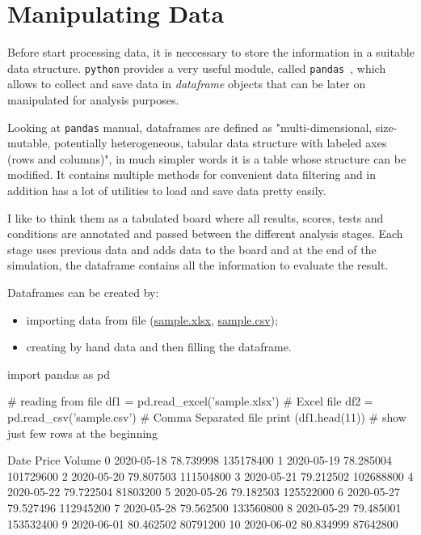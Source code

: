\section{Manipulating Data}
Before start processing data, it is neccessary to store the information in a suitable data structure. \texttt{python} provides a very useful module, called \texttt{pandas}~\cite{pandas}, which allows to collect and save data in \emph{dataframe} objects that can be later on manipulated for analysis purposes.

Looking at \texttt{pandas} manual, dataframes are defined as "multi-dimensional, size-mutable, potentially heterogeneous, tabular data structure with labeled axes (rows and columns)", in much simpler words it is a table whose structure can be modified.
It contains multiple methods for convenient data filtering and in addition has a lot of utilities to load and save data pretty easily.

I like to think them as a tabulated board where all results, scores, tests and conditions are annotated and passed between the different analysis stages. Each stage uses previous data and adds data to the board and at the end of the simulation, the dataframe contains all the information to evaluate the result.


Dataframes can be created by:
\begin{itemize}
\tightlist
\item importing data from file (\href{https://github.com/matteosan1/finance_course/blob/develop/libro/input_files/sample.xlsx?raw=true}{sample.xlsx}, \href{https://raw.githubusercontent.com/matteosan1/finance_course/develop/libro/input_files/sample.csv}{sample.csv});
\item creating by hand data and then filling the dataframe.
\end{itemize}

\begin{ipython}
import pandas as pd

# reading from file
df1 = pd.read_excel('sample.xlsx') # Excel file
df2 = pd.read_csv('sample.csv') # Comma Separated file
print (df1.head(11)) # show just few rows at the beginning
\end{ipython}
\begin{ioutput}
         Date      Price     Volume
0  2020-05-18  78.739998  135178400
1  2020-05-19  78.285004  101729600
2  2020-05-20  79.807503  111504800
3  2020-05-21  79.212502  102688800
4  2020-05-22  79.722504   81803200
5  2020-05-26  79.182503  125522000
6  2020-05-27  79.527496  112945200
7  2020-05-28  79.562500  133560800
8  2020-05-29  79.485001  153532400
9  2020-06-01  80.462502   80791200
10 2020-06-02  80.834999   87642800
\end{ioutput}

